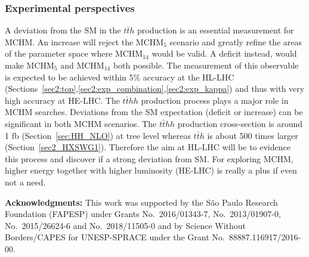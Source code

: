 %
\subsubsection{Experimental perspectives}
\label{perpectives}
%
A deviation from the SM in the $t{\bar t}h$ production is an essential measurement for MCHM. An increase will reject the MCHM$_5$ scenario and greatly refine the areas of the parameter space where MCHM$_{14}$ would be valid. A deficit instead, would make MCHM$_5$ and MCHM$_{14}$ both possible. The measurement of this observable is expected to be achieved within 5\% accuracy at the HL-LHC (Sections~\ref{sec2:top},\ref{sec2:exp_combination},\ref{sec2:exp_kappa}) and thus with very high accuracy at HE-LHC. The $t{\bar t}hh$ production process plays a major role in MCHM searches. Deviations from the SM expectation (deficit or increase) can be significant in both MCHM scenarios. The $t{\bar t}hh$ production cross-section is around 1 fb (Section~\ref{sec:HH_NLO}) at tree level whereas $t{\bar t}h$ is about 500 times larger (Section~\ref{sec2_HXSWG1}). Therefore the aim at HL-LHC will be to evidence this process and discover if a strong deviation from SM. For exploring MCHM, higher energy together with higher luminosity (HE-LHC) is really a plus if even not a need. 

\textbf{Acknowledgments:}
This work was supported by the S\~ao Paulo Research Foundation
(FAPESP) under Grants No.~2016/01343-7, No.~2013/01907-0,
No.~2015/26624-6 and No.~2018/11505-0 and by Science Without Borders/CAPES for UNESP-SPRACE under the Grant No.~88887.116917/2016-00.
